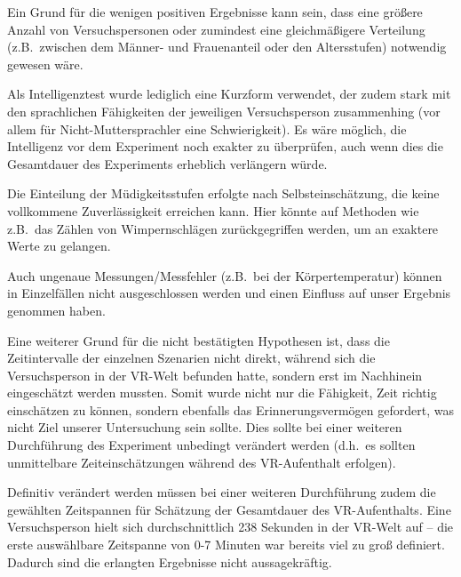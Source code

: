 \documentclass{Paper}
\begin{document}
Ein Grund für die wenigen positiven Ergebnisse kann sein, dass eine größere Anzahl von Versuchspersonen oder zumindest eine gleichmäßigere Verteilung (z.B.\ zwischen dem Männer- und Frauenanteil oder den Altersstufen) notwendig gewesen wäre.

Als Intelligenztest wurde lediglich eine Kurzform verwendet, der zudem stark mit den sprachlichen Fähigkeiten der jeweiligen Versuchsperson zusammenhing (vor allem für Nicht-Muttersprachler eine Schwierigkeit). Es wäre möglich, die Intelligenz vor dem Experiment noch exakter zu überprüfen, auch wenn dies die Gesamtdauer des Experiments erheblich verlängern würde.

Die Einteilung der Müdigkeitsstufen erfolgte nach Selbsteinschätzung, die keine vollkommene Zuverlässigkeit erreichen kann. Hier könnte auf Methoden wie z.B.\ das Zählen von Wimpernschlägen zurückgegriffen werden, um an exaktere Werte zu gelangen.

Auch ungenaue Messungen/Messfehler (z.B.\ bei der Körpertemperatur) können in Einzelfällen nicht ausgeschlossen werden und einen Einfluss auf unser Ergebnis genommen haben.

Eine weiterer Grund für die nicht bestätigten Hypothesen ist, dass die Zeitintervalle der einzelnen Szenarien nicht direkt, während sich die Versuchsperson in der VR-Welt befunden hatte, sondern erst im Nachhinein eingeschätzt werden mussten.
Somit wurde nicht nur die Fähigkeit, Zeit richtig einschätzen zu können, sondern
ebenfalls das Erinnerungsvermögen gefordert, was nicht Ziel unserer Untersuchung sein sollte. Dies sollte bei einer weiteren Durchführung des Experiment unbedingt verändert werden (d.h.\ es sollten unmittelbare Zeiteinschätzungen während des VR-Aufenthalt erfolgen).

Definitiv verändert werden müssen bei einer weiteren Durchführung zudem die gewählten Zeitspannen für Schätzung der Gesamtdauer des VR-Aufenthalts. Eine Versuchsperson hielt sich durchschnittlich 238 Sekunden in der VR-Welt auf -- die erste auswählbare Zeitspanne von 0-7 Minuten war bereits viel zu groß definiert. Dadurch sind die erlangten Ergebnisse nicht aussagekräftig.





\end{document}
